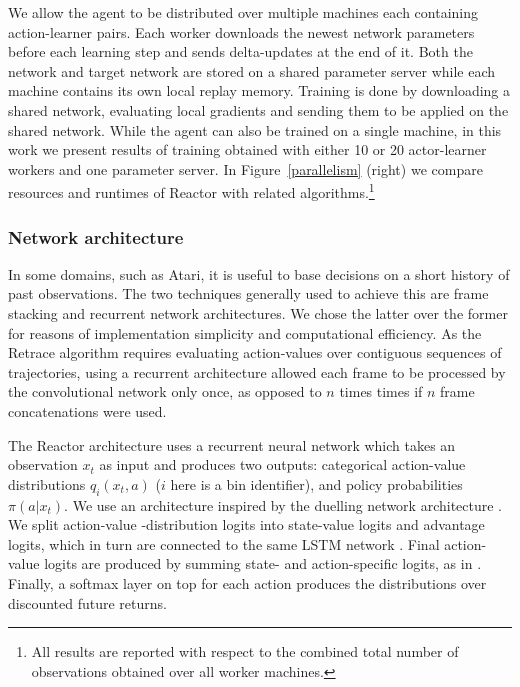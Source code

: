 \documentclass{article}
\begin{document}
We allow the agent to be distributed over 
multiple machines each containing action-learner pairs. Each worker downloads the 
newest network parameters before each learning step and sends delta-updates at 
the end of it. Both the network and target 
network are stored on a 
shared parameter server while each machine contains its own local replay 
memory. 
Training is done by downloading a shared network, evaluating local gradients 
and 
sending them to be applied on the shared network. While the agent can also be 
trained on a single machine, in this work we present results of 
training obtained with either 10 or 20 actor-learner workers and one parameter server.
In Figure~\ref{parallelism} (right) we compare resources and runtimes of 
Reactor with related algorithms.\footnote{All results are reported with respect 
to the combined total number of observations obtained over all worker machines.}





\subsubsection{Network architecture}\label{sec:net_arch}
In some domains, such as Atari, it is useful to base decisions on a 
short history of past observations. The two techniques generally used to 
achieve this are frame stacking and recurrent network architectures. We 
chose the latter over the former for reasons 
of implementation simplicity and computational 
efficiency. As the Retrace algorithm requires evaluating action-values over contiguous 
sequences of trajectories, using a recurrent architecture allowed each frame to 
be processed by the convolutional network only once, as opposed to $n$ times 
times if $n$ frame concatenations were used. 

The Reactor architecture uses a recurrent neural network which 
takes an observation $x_t$ as input and produces two outputs:  
categorical action-value distributions $q_i(x_t, a)$ ($i$ here is a bin 
identifier), and policy probabilities $\pi(a|x_t)$. 
We use an architecture inspired by the duelling network architecture 
\citep{wang2015dueling}. We split action-value -distribution logits into 
state-value logits and advantage logits, which 
in turn are connected to the same LSTM network \citep{hochreiter1997long}.
Final action-value logits are produced by summing state- and action-specific 
logits, as in \citet{wang2015dueling}. Finally, a softmax layer on top for each action produces the distributions over discounted 
future returns.
\end{document}
